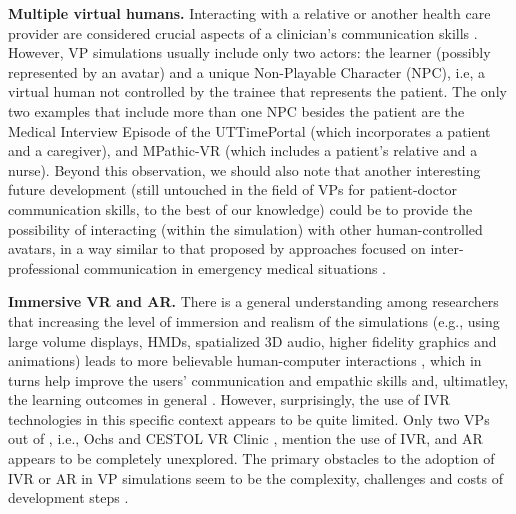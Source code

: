 \textbf{Multiple virtual humans.}
Interacting with a relative or another health care provider are considered crucial aspects of a clinician's communication skills \cite{hallin2011effects,kee2018communication}. However, VP simulations usually include only two actors: the learner (possibly represented by an avatar) and a unique Non-Playable Character (NPC), i.e, a virtual human not controlled by the trainee that represents the patient. The only two examples that include more than one NPC besides the patient are the Medical Interview Episode of the UTTimePortal \cite{zielke2016beyond,zielke2016using} (which incorporates a patient and a caregiver), and MPathic-VR \cite{guetterman2019medical,kron2017using} (which includes a patient's relative and a nurse). 
Beyond this observation, we should also note that another interesting future development (still untouched in the field of VPs for patient-doctor communication skills, to the best of our knowledge) could be to provide the possibility of interacting (within the simulation) with other human-controlled avatars, in a way similar to that proposed by approaches focused on inter-professional communication in emergency medical situations \cite{anbro2020using}. 


\textbf{Immersive VR and AR.}
There is a general understanding among researchers that increasing the level of immersion and realism of the simulations (e.g., using large volume displays, HMDs, spatialized 3D audio, higher fidelity graphics and animations) leads to more believable human-computer interactions \cite{chuah2013exploring,johnsen2008evaluation}, which in turns help improve the users' communication and empathic skills  \cite{ochs2019training,zielke2017developing} and, ultimatley, the learning outcomes in general \cite{limniou2008full}. 
However, surprisingly, the use of IVR technologies in this specific context appears to be quite limited. Only two VPs out of \totalVPs, i.e., Ochs \cite{ochs2019training} and CESTOL VR Clinic \cite{sapkaroski2018implementation}, mention the use of IVR, and AR appears to be completely unexplored.  The primary obstacles to the adoption of IVR or AR in VP simulations seem to be the complexity, challenges and costs of development steps \cite{zielke2017developing}.  

